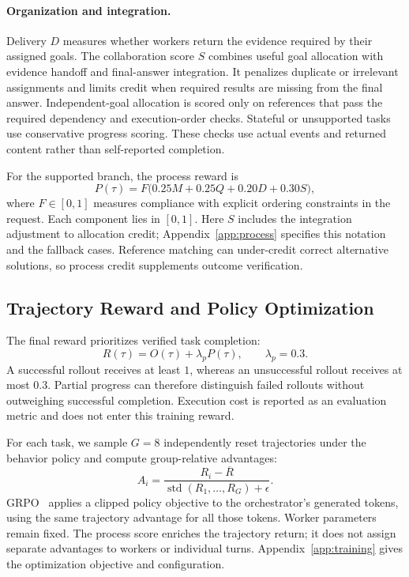 \paragraph{Organization and integration.}
Delivery $D$ measures whether workers return the evidence required by their assigned goals. The collaboration score $S$ combines useful goal allocation with evidence handoff and final-answer integration. It penalizes duplicate or irrelevant assignments and limits credit when required results are missing from the final answer. Independent-goal allocation is scored only on references that pass the required dependency and execution-order checks. Stateful or unsupported tasks use conservative progress scoring. These checks use actual events and returned content rather than self-reported completion.

For the supported branch, the process reward is
\begin{equation}
 P(\tau)=F\bigl(0.25M+0.25Q+0.20D+0.30S\bigr),
 \label{eq:process}
\end{equation}
where $F\in[0,1]$ measures compliance with explicit ordering constraints in the request. Each component lies in $[0,1]$. Here $S$ includes the integration adjustment to allocation credit; Appendix~\ref{app:process} specifies this notation and the fallback cases. Reference matching can under-credit correct alternative solutions, so process credit supplements outcome verification.

\subsection{Trajectory Reward and Policy Optimization}
\label{sec:objective}

The final reward prioritizes verified task completion:
\begin{equation}
 R(\tau)=O(\tau)+\lambda_pP(\tau),\qquad\lambda_p=0.3.
 \label{eq:reward}
\end{equation}
A successful rollout receives at least $1$, whereas an unsuccessful rollout receives at most $0.3$. Partial progress can therefore distinguish failed rollouts without outweighing successful completion. Execution cost is reported as an evaluation metric and does not enter this training reward.

For each task, we sample $G=8$ independently reset trajectories under the behavior policy and compute group-relative advantages:
\begin{equation}
 A_i=\frac{R_i-\overline R}{\operatorname{std}(R_1,\ldots,R_G)+\epsilon}.
 \label{eq:advantage}
\end{equation}
GRPO~\citep{shao2024deepseekmath} applies a clipped policy objective to the orchestrator's generated tokens, using the same trajectory advantage for all those tokens. Worker parameters remain fixed. The process score enriches the trajectory return; it does not assign separate advantages to workers or individual turns. Appendix~\ref{app:training} gives the optimization objective and configuration.
